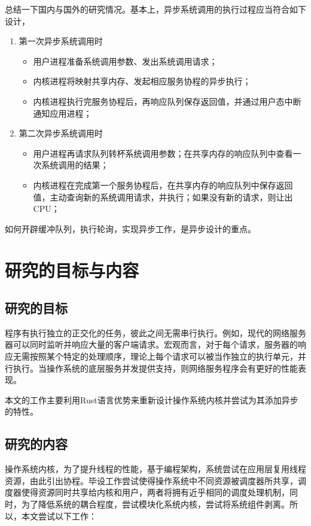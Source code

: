 总结一下国内与国外的研究情况。基本上，异步系统调用的执行过程应当符合如下设计，
\begin{enumerate}
    \item 第一次异步系统调用时
    \begin{itemize}
        \item 用户进程准备系统调用参数、发出系统调用请求；
        \item 内核进程将映射共享内存、发起相应服务协程的异步执行；
        \item 内核进程执行完服务协程后，再响应队列保存返回值，并通过用户态中断通知应用进程；
    \end{itemize}
    \item 第二次异步系统调用时
    \begin {itemize}
        \item 用户进程再请求队列转杯系统调用参数；在共享内存的响应队列中查看一次系统调用的结果；
        \item 内核进程在完成第一个服务协程后，在共享内存的响应队列中保存返回值，主动查询新的系统调用请求，并执行；如果没有新的请求，则让出CPU；
    \end{itemize}
\end{enumerate}

如何开辟缓冲队列，执行轮询，实现异步工作，是异步设计的重点。

\section{研究的目标与内容}

\subsection{研究的目标}

程序有执行独立的正交化的任务，彼此之间无需串行执行。例如，现代的网络服务器可以同时监听并响应大量的客户端请求。宏观而言，对于每个请求，服务器的响应无需按照某个特定的处理顺序，理论上每个请求可以被当作独立的执行单元，并行执行。当操作系统的底层服务并发提供支持，则网络服务程序会有更好的性能表现。

本文的工作主要利用Rust语言优势来重新设计操作系统内核并尝试为其添加异步的特性。

\subsection{研究的内容}

操作系统内核，为了提升线程的性能，基于编程架构，系统尝试在应用层复用线程资源，由此引出协程。毕设工作尝试使得操作系统中不同资源被调度器所共享，调度器使得资源同时共享给内核和用户，两者将拥有近乎相同的调度处理机制，同时，为了降低系统的耦合程度，尝试模块化系统内核，尝试将系统组件剥离。所以，本文尝试以下工作：

